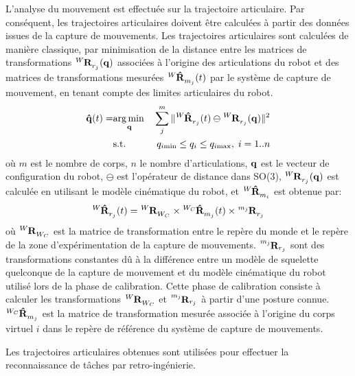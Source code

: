 L'analyse du mouvement est effectuée sur la trajectoire articulaire.
Par conséquent, les trajectoires articulaires doivent être calculées à partir des
données issues de la capture de mouvements.
Les trajectoires articulaires sont calculées de manière classique, par minimisation
de la distance entre les matrices de transformations $\mTransfMatrix{W}{R}{r_j}(\mbf{q})$
associées à l'origine des articulations du robot et des matrices de transformations mesurées
$\tensor[^{W}]{\mathbf{\hat{R}}}{_{m_j}}(t)$ par le système de capture de mouvement,
en tenant compte des limites articulaires du robot. 
\begin{eqnarray}
  \mbf{\hat{q}}(t) =  & \underset{\mbf{q}}\argmin & \sum_j^m \Vert \tensor[^{W}]{\mathbf{\hat{R}}}{_{r_j}}(t) \ominus \tensor[^{W}]{\mathbf{R}}{_{r_j}}(\mbf{q}) \Vert ^2\\
    & \text{s.t.} & q_{i\mathrm{min}} \leq q_i \leq q_{i\mathrm{max}}, \; i = 1..n
  \label{mocapOpti}
\end{eqnarray}
où $m$ est le nombre de corps, $n$ le nombre
d'articulations, ${\mathbf{q}}$ est le vecteur de configuration du robot,
$\ominus$ est l'opérateur de distance dans SO(3), 
$\tensor[^{W}]{\mathbf{R}}{_{r_j}}(\mbf{q})$ est calculée en utilisant le modèle cinématique du robot, 
et $\tensor[^{W}]{\mathbf{\hat{R}}}{_{m_i}}$ est obtenue par:
\begin{equation}
  \tensor[^{W}]{\mathbf{\hat{R}}}{_{r_j}}(t) = \tensor[^{W}]{\mathbf{R}}{_{W_{C}}} \times \tensor[^{W_{C}}]{\mathbf{\hat{R}}}{_{m_j}}(t) \times \tensor[^{m_j}]{\mathbf{R}}{_{r_j}}    
  \label{mocapMatrix}
\end{equation}
où $\tensor[^{W}]{\mathbf{R}}{_{W_{C}}}$ est 
la matrice de transformation entre le repère du monde
et le repère de la zone d'expérimentation de la capture de mouvements.
$\mTransfMatrix{m_j}{R}{r_j}$ sont des 
transformations constantes dû à la différence entre un modèle de squelette quelconque de la capture de
mouvement et du modèle cinématique du robot utilisé lors de la phase de calibration.
Cette phase de calibration consiste à calculer les transformations $\tensor[^{W}]{\mathbf{R}}{_{W_{C}}}$
et $\tensor[^{m_j}]{\mathbf{R}}{_{r_j}}$ à partir d'une posture connue.
$\tensor[^{W_{C}}]{\mathbf{\hat{R}}}{_{m_j}}$
est la matrice de transformation mesurée associée à l'origine 
du corps virtuel $i$ dans le repère de référence du système de capture de mouvements.

Les trajectoires articulaires obtenues sont utilisées pour effectuer la reconnaissance de t\^aches
par retro-ingénierie.

